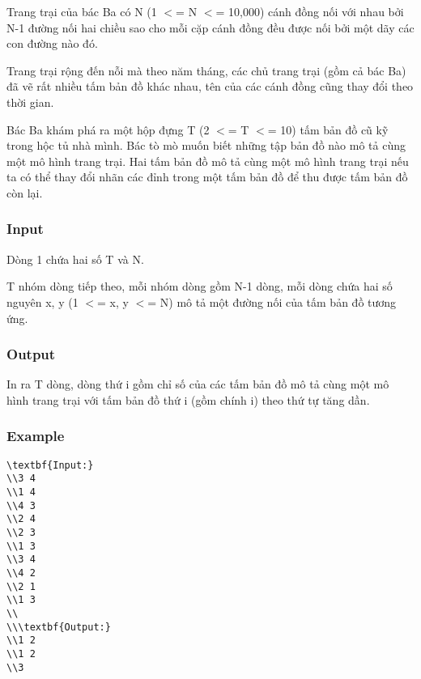 



   Trang trại của bác Ba có N (1 $<$= N $<$= 10,000) cánh đồng nối với nhau bởi N-1 đường nối hai chiều sao cho mỗi cặp cánh đồng đều được nối bởi một dãy các con đường nào đó.  

   Trang trại rộng đến nỗi mà theo năm tháng, các chủ trang trại (gồm cả bác Ba) đã vẽ rất nhiều tấm bản đồ khác nhau, tên của các cánh đồng cũng thay đổi theo thời gian.  

   Bác Ba khám phá ra một hộp đựng T (2 $<$= T $<$= 10) tấm bản đồ cũ kỹ trong hộc tủ nhà mình. Bác tò mò muốn biết những tập bản đồ nào mô tả cùng một mô hình trang trại. Hai tấm bản đồ mô tả cùng một mô hình trang trại nếu ta có thể thay đổi nhãn các đỉnh trong một tấm bản đồ để thu được tấm bản đồ còn lại.  

\subsubsection{   Input  }

   Dòng 1 chứa hai số T và N.  

   T nhóm dòng tiếp theo, mỗi nhóm dòng gồm N-1 dòng, mỗi dòng chứa hai số nguyên x, y (1 $<$= x, y $<$= N) mô tả một đường nối của tấm bản đồ tương ứng.  

\subsubsection{   Output  }

   In ra T dòng, dòng thứ i gồm chỉ số của các tấm bản đồ mô tả cùng một mô hình trang trại với tấm bản đồ thứ i (gồm chính i) theo thứ tự tăng dần.  

\subsubsection{   Example  }
\begin{verbatim}
\textbf{Input:}
\\3 4
\\1 4
\\4 3
\\2 4
\\2 3
\\1 3
\\3 4
\\4 2
\\2 1
\\1 3
\\
\\\textbf{Output:}
\\1 2
\\1 2
\\3\end{verbatim}